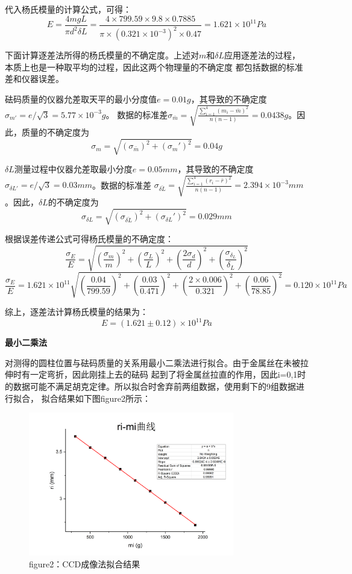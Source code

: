 \documentclass{article}
\begin{document}
    代入杨氏模量的计算公式，可得：
    $$E=\frac{4mgL}{\pi d^2 \delta L}=\frac{4\times 799.59 \times 9.8 \times 0.7885}{\pi \times (0.321\times 10^{-3})^2 \times 0.47}=1.621\times 10^{11}Pa$$

    下面计算逐差法所得的杨氏模量的不确定度。上述对$m$和$\delta L$应用逐差法的过程，本质上也是一种取平均的过程，因此这两个物理量的不确定度
    都包括数据的标准差和仪器误差。

    砝码质量的仪器允差取天平的最小分度值$e=0.01g$，其导致的不确定度$\sigma_{m'}=e/\sqrt{3}=5.77\times 10^{-3}g$。
    数据的标准差$\sigma_{\bar{m}}=\sqrt{\frac{\sum_{i=1}^{4} (m_i-\bar{m})^2}{n(n-1)}}=0.0438g$。因此，质量的不确定度为
    $$\sigma_m=\sqrt{(\sigma_{\bar{m}})^2+(\sigma_m')^2}=0.04g$$

    $\delta L$测量过程中仪器允差取最小分度$e=0.05mm$，其导致的不确定度$\sigma_{\delta L'}=e/\sqrt{3}=0.03mm$。数据的标准差
    $\sigma_{\bar{\delta L}}=\sqrt{\frac{\sum_{i=1}^{4} (r_i-\bar{r})^2}{n(n-1)}}=2.394\times 10^{-3}mm$。因此，$\delta L$的不确定度为
    $$\sigma_{\delta L}=\sqrt{(\sigma_{\bar{\delta L}})^2+(\sigma_{\delta L}')^2}=0.029mm$$

    根据误差传递公式可得杨氏模量的不确定度：
    $$\frac{\sigma_E}{E}=\sqrt{(\frac{\sigma_m}{m})^2+(\frac{\sigma_L}{L})^2+(\frac{2\sigma_d}{d})^2+(\frac{\sigma_{\delta_L}}{\delta_L})^2}$$
    $$\frac{\sigma_E}{E}=1.621\times 10^{11} \sqrt{(\frac{0.04}{799.59})^2+(\frac{0.03}{0.471})^2+(\frac{2\times 0.006}{0.321})^2+(\frac{0.06}{78.85})^2}=0.120\times 10^{11}Pa$$

    综上，逐差法计算杨氏模量的结果为：
    $$E=(1.621\pm 0.12)\times 10^{11}Pa$$



    \textbf{最小二乘法}

    对测得的圆柱位置与砝码质量的关系用最小二乘法进行拟合。由于金属丝在未被拉伸时有一定弯折，因此刚挂上去的砝码
   起到了将金属丝拉直的作用，因此i=0,1时的数据可能不满足胡克定律。所以拟合时舍弃前两组数据，使用剩下的9组数据进行拟合，
   拟合结果如下图figure2所示：
   
   \begin{figure}[htb]
        \centering
        \includegraphics[width=0.8\textwidth]{CCD成像法拟合曲线.jpg}
        \caption{figure2：CCD成像法拟合结果}
    \end{figure}
\end{document}
